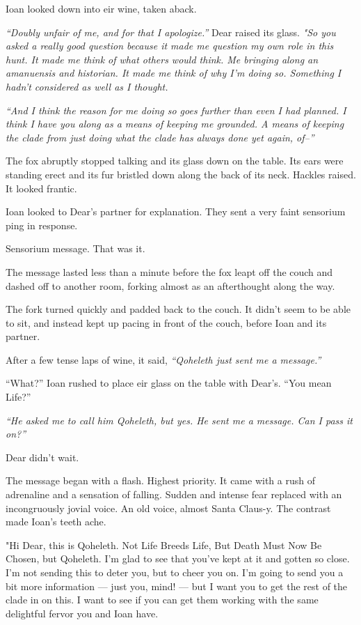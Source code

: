 Ioan looked down into eir wine, taken aback.

\emph{``Doubly unfair of me, and for that I apologize.''} Dear raised its glass. \emph{"So you asked a really good question because it made me question my own role in this hunt. It made me think of what others would think. Me bringing along an amanuensis and historian. It made me think of why I'm doing so. Something I hadn't considered as well as I thought.}

\emph{``And I think the reason for me doing so goes further than even I had planned. I think I have you along as a means of keeping me grounded. A means of keeping the clade from just doing what the clade has always done yet again, of--''}

The fox abruptly stopped talking and its glass down on the table. Its ears were standing erect and its fur bristled down along the back of its neck. Hackles raised. It looked frantic.

Ioan looked to Dear's partner for explanation. They sent a very faint sensorium ping in response.

Sensorium message. That was it.

The message lasted less than a minute before the fox leapt off the couch and dashed off to another room, forking almost as an afterthought along the way.

The fork turned quickly and padded back to the couch. It didn't seem to be able to sit, and instead kept up pacing in front of the couch, before Ioan and its partner.

After a few tense laps of wine, it said, \emph{``Qoheleth just sent me a message.''}

``What?'' Ioan rushed to place eir glass on the table with Dear's. ``You mean Life?''

\emph{``He asked me to call him Qoheleth, but yes. He sent me a message. Can I pass it on?''}

Dear didn't wait.

The message began with a flash. Highest priority. It came with a rush of adrenaline and a sensation of falling. Sudden and intense fear replaced with an incongruously jovial voice. An old voice, almost Santa Claus-y. The contrast made Ioan's teeth ache.

"Hi Dear, this is Qoheleth. Not Life Breeds Life, But Death Must Now Be Chosen, but Qoheleth. I'm glad to see that you've kept at it and gotten so close. I'm not sending this to deter you, but to cheer you on. I'm going to send you a bit more information — just you, mind! — but I want you to get the rest of the clade in on this. I want to see if you can get them working with the same delightful fervor you and Ioan have.

